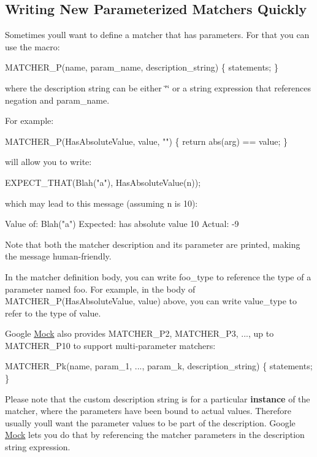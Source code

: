 \subsection*{Writing New Parameterized Matchers Quickly}

Sometimes you\textquotesingle{}ll want to define a matcher that has parameters. For that you can use the macro\+: 
\begin{DoxyCode}
MATCHER\_P(name, param\_name, description\_string) \{ statements; \}
\end{DoxyCode}
 where the description string can be either {\ttfamily \char`\"{}\char`\"{}} or a string expression that references {\ttfamily negation} and {\ttfamily param\+\_\+name}.

For example\+: 
\begin{DoxyCode}
MATCHER\_P(HasAbsoluteValue, value, "") \{ return abs(arg) == value; \}
\end{DoxyCode}
 will allow you to write\+: 
\begin{DoxyCode}
EXPECT\_THAT(Blah("a"), HasAbsoluteValue(n));
\end{DoxyCode}
 which may lead to this message (assuming {\ttfamily n} is 10)\+: 
\begin{DoxyCode}
Value of: Blah("a")
Expected: has absolute value 10
  Actual: -9
\end{DoxyCode}


Note that both the matcher description and its parameter are printed, making the message human-\/friendly.

In the matcher definition body, you can write {\ttfamily foo\+\_\+type} to reference the type of a parameter named {\ttfamily foo}. For example, in the body of {\ttfamily M\+A\+T\+C\+H\+E\+R\+\_\+\+P(\+Has\+Absolute\+Value, value)} above, you can write {\ttfamily value\+\_\+type} to refer to the type of {\ttfamily value}.

Google \hyperlink{class_mock}{Mock} also provides {\ttfamily M\+A\+T\+C\+H\+E\+R\+\_\+\+P2}, {\ttfamily M\+A\+T\+C\+H\+E\+R\+\_\+\+P3}, ..., up to {\ttfamily M\+A\+T\+C\+H\+E\+R\+\_\+\+P10} to support multi-\/parameter matchers\+: 
\begin{DoxyCode}
MATCHER\_Pk(name, param\_1, ..., param\_k, description\_string) \{ statements; \}
\end{DoxyCode}


Please note that the custom description string is for a particular {\bfseries instance} of the matcher, where the parameters have been bound to actual values. Therefore usually you\textquotesingle{}ll want the parameter values to be part of the description. Google \hyperlink{class_mock}{Mock} lets you do that by referencing the matcher parameters in the description string expression.

